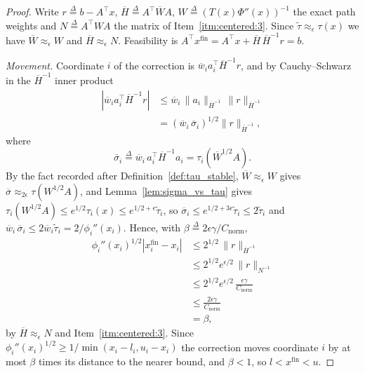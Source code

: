 \documentclass[11pt]{article}
\newcommand{\tautil}{\widetilde{\tau}}
\newcommand{\defeq}{\stackrel{\Delta}{=}}
\newcommand{\Cnorm}{C_{\mathrm{norm}}}
\begin{document}
\begin{proof}
Write $r \defeq b - A^\top x$,
$\overline{H} \defeq A^\top \overline{W} A$,
$W \defeq (T(x) \Phi''(x))^{-1}$ the exact path weights and
$N \defeq A^\top W A$ the matrix of Item~\ref{itm:centered:3}.
Since $\tautil \approx_{\epsilon} \tau(x)$ we have
$\overline{W} \approx_{\epsilon} W$ and
$\overline{H} \approx_{\epsilon} N$.
Feasibility is
$A^\top x^{\mathrm{fin}} = A^\top x + \overline{H} \, \overline{H}^{-1} r = b$.

\emph{Movement.}
Coordinate $i$ of the correction is
$\overline{w}_i a_i^\top \overline{H}^{-1} r$, and by Cauchy--Schwarz in the
$\overline{H}^{-1}$ inner product
\[
\begin{aligned}
\left| \overline{w}_i a_i^\top \overline{H}^{-1} r \right|
&\le
\overline{w}_i \, \|a_i\|_{\overline{H}^{-1}} \, \|r\|_{\overline{H}^{-1}}
\\
&=
\left( \overline{w}_i \, \overline{\sigma}_i \right)^{1/2}
\|r\|_{\overline{H}^{-1}} ,
\end{aligned}
\]
where
\[
\overline{\sigma}_i
\defeq
\overline{w}_i \, a_i^\top \overline{H}^{-1} a_i
=
\tau_i\left( \overline{W}^{1/2} A \right) .
\]
By the fact recorded after Definition~\ref{def:tau_stable},
$\overline{W} \approx_{\epsilon} W$ gives
$\overline{\sigma} \approx_{2 \epsilon} \tau(W^{1/2} A)$, and
Lemma~\ref{lem:sigma_vs_tau} gives
$\tau_i(W^{1/2} A) \le e^{1/2} \tau_i(x) \le e^{1/2 + \epsilon} \tautil_i$, so
$\overline{\sigma}_i \le e^{1/2 + 3 \epsilon} \tautil_i \le 2 \tautil_i$ and
$\overline{w}_i \, \overline{\sigma}_i \le 2 \overline{w}_i \tautil_i = 2 / \phi_i''(x_i)$.
Hence, with $\beta \defeq 2 \epsilon \gamma / \Cnorm$,
\[
\begin{aligned}
\phi_i''(x_i)^{1/2}
\left| x^{\mathrm{fin}}_i - x_i \right|
&\le
2^{1/2} \, \|r\|_{\overline{H}^{-1}}
\\
&\le
2^{1/2} e^{\epsilon / 2} \, \|r\|_{N^{-1}}
\\
&\le
2^{1/2} e^{\epsilon / 2} \, \frac{\epsilon \gamma}{\Cnorm}
\\
&\le
\frac{2 \epsilon \gamma}{\Cnorm}
\\
&=
\beta ,
\end{aligned}
\]
by $\overline{H} \approx_{\epsilon} N$ and Item~\ref{itm:centered:3}.
Since $\phi_i''(x_i)^{1/2} \ge 1 / \min(x_i - l_i, u_i - x_i)$ the correction
moves coordinate $i$ by at most
$\beta$ times its distance to the nearer bound, and
$\beta < 1$, so
$l < x^{\mathrm{fin}} < u$.


\end{proof}
\end{document}
